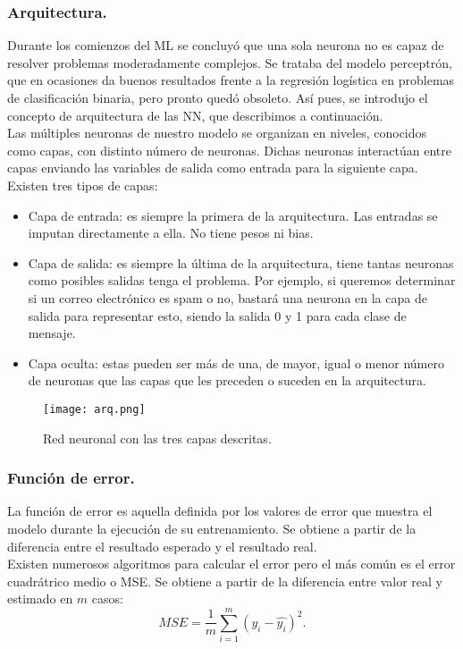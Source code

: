 \documentclass[a4paper,11pt]{article}
\begin{document}
\subsubsection{Arquitectura.}
Durante los comienzos del ML se concluyó que una sola neurona no es capaz de
resolver problemas moderadamente complejos. Se trataba del modelo perceptrón,
que en ocasiones da buenos resultados frente a la regresión logística en problemas
de clasificación binaria, pero pronto quedó obsoleto. Así pues, se introdujo el
concepto de arquitectura de las NN, que describimos a continuación.\\

\noindent
Las múltiples neuronas de nuestro modelo se organizan en niveles, conocidos como capas, con distinto número de neuronas. Dichas neuronas interactúan entre capas enviando las variables de salida como entrada para la siguiente capa.
Existen tres tipos de capas:
\begin{itemize}
    \item Capa de entrada: es siempre la primera de la arquitectura. Las entradas se imputan directamente a ella. No tiene pesos ni bias.
    \item Capa de salida: es siempre la última de la arquitectura, tiene tantas neuronas como posibles salidas tenga el problema. Por ejemplo, si queremos determinar si un correo electrónico es spam o no, bastará una neurona en la capa de salida para representar esto, siendo la salida 0 y 1 para cada clase de mensaje. 
    \item Capa oculta: estas pueden ser más de una, de mayor, igual o menor número de neuronas que las capas que les preceden o suceden en la arquitectura.
\end{itemize} 
\begin{figure}[H]
\centering
\texttt{[image: arq.png]}
\caption{Red neuronal con las tres capas descritas.}
\end{figure}
\subsubsection{Función de error.}
La función de error es aquella definida por los valores de error que muestra el modelo durante la ejecución de su entrenamiento. Se obtiene a partir de la diferencia entre el resultado esperado y el resultado real.\\

\noindent
Existen numerosos algoritmos para calcular el error pero el más común es el error cuadrátrico medio o MSE. Se obtiene a partir de la diferencia entre valor real y estimado en $m$ casos:
\begin{equation}
MSE=\frac{1}{m}\sum_{i=1}^m (y_i - \hat{y_i})^2.
\end{equation}
\end{document}
